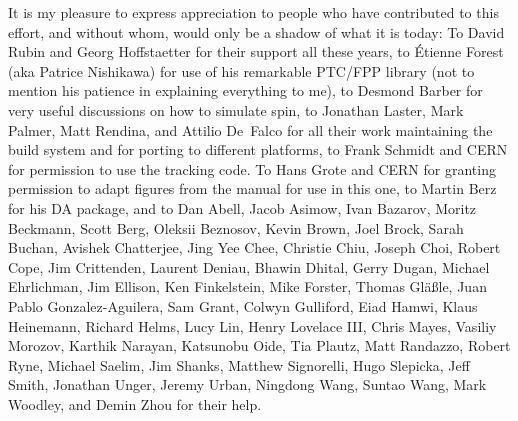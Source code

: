 It is my pleasure to express appreciation to people who have contributed to this effort, and without
whom, \bmad would only be a shadow of what it is today: To David Rubin and Georg Hoffstaetter for
their support all these years, to \'Etienne Forest (aka Patrice Nishikawa) for use of his remarkable
PTC/FPP library (not to mention his patience in explaining everything to me), to Desmond Barber for
very useful discussions on how to simulate spin, to Jonathan Laster, Mark Palmer, Matt Rendina, and
Attilio De~Falco for all their work maintaining the build system and for porting \bmad to different
platforms, to Frank Schmidt and CERN for permission to use the \mad tracking code. To Hans Grote and
CERN for granting permission to adapt figures from the \mad manual for use in this one, to Martin
Berz for his DA package, and to Dan Abell, Jacob Asimow, Ivan Bazarov, Moritz Beckmann, Scott Berg,
Oleksii Beznosov, Kevin Brown, Joel Brock, Sarah Buchan, Avishek Chatterjee, Jing Yee Chee, Christie
Chiu, Joseph Choi, Robert Cope, Jim Crittenden, Laurent Deniau, Bhawin Dhital, Gerry Dugan, Michael
Ehrlichman, Jim Ellison, Ken Finkelstein, Mike Forster, Thomas Gl{\"a}{\ss}le, Juan Pablo
Gonzalez-Aguilera, Sam Grant, Colwyn Gulliford, Eiad Hamwi, Klaus Heinemann, Richard Helms, Lucy
Lin, Henry Lovelace III, Chris Mayes, Vasiliy Morozov, Karthik Narayan, Katsunobu Oide, Tia Plautz,
Matt Randazzo, Robert Ryne, Michael Saelim, Jim Shanks, Matthew Signorelli, Hugo Slepicka, Jeff
Smith, Jonathan Unger, Jeremy Urban, Ningdong Wang, Suntao Wang, Mark Woodley, and Demin Zhou for
their help.

